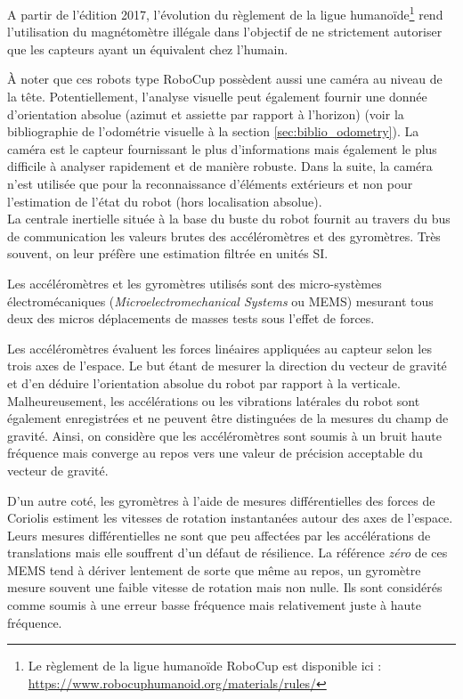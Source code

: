 A partir de l'édition 2017, l'évolution du règlement de la ligue 
humanoïde\footnote{Le règlement de la ligue humanoïde 
RoboCup est disponible ici : \url{https://www.robocuphumanoid.org/materials/rules/}}
rend l'utilisation du magnétomètre illégale dans l'objectif de ne strictement 
autoriser que les capteurs ayant un équivalent chez l'humain.

À noter que ces robots \og type RoboCup \fg possèdent aussi
une caméra au niveau de la tête. 
Potentiellement, l'analyse visuelle peut également fournir une donnée
d'orientation absolue (azimut et assiette par rapport à l'horizon)
(voir la bibliographie de l'odométrie visuelle à la section \ref{sec:biblio_odometry}).
La caméra est le capteur fournissant le plus d'informations mais également
le plus difficile à analyser rapidement et de manière robuste.
Dans la suite, la caméra n'est utilisée que pour la reconnaissance 
d'éléments extérieurs et non pour l'estimation de l'état du 
robot (hors localisation absolue).\\

La centrale inertielle située à la base du buste du robot
fournit au travers du bus de communication les valeurs brutes
des accéléromètres et des gyromètres.
Très souvent, on leur préfère une estimation filtrée en unités SI.

Les accéléromètres et les gyromètres utilisés sont des
micro-systèmes électromécaniques (\textit{Microelectromechanical Systems} ou MEMS)
mesurant tous deux des micros déplacements de masses tests sous l'effet de forces.

Les accéléromètres évaluent les forces linéaires appliquées 
au capteur selon les trois axes de l'espace.
Le but étant de mesurer la direction du vecteur de gravité et d'en
déduire l'orientation absolue du robot par rapport à la verticale.
Malheureusement, les accélérations ou les vibrations latérales
du robot sont également enregistrées et ne peuvent
être distinguées de la mesures du champ de gravité.
Ainsi, on considère que les accéléromètres sont soumis
à un bruit haute fréquence mais converge au repos vers 
une valeur de précision acceptable du vecteur de gravité.

D'un autre coté, les gyromètres à l'aide de mesures différentielles 
des forces de Coriolis estiment les vitesses de rotation
instantanées autour des axes de l'espace. 
Leurs mesures différentielles ne sont que peu affectées par 
les accélérations de translations mais elle souffrent d'un défaut 
de résilience. La référence \textit{zéro} de ces MEMS tend à dériver
lentement de sorte que même au repos, un gyromètre mesure souvent une
faible vitesse de rotation mais non nulle. Ils sont considérés comme
soumis à une erreur basse fréquence mais relativement juste 
à haute fréquence.


